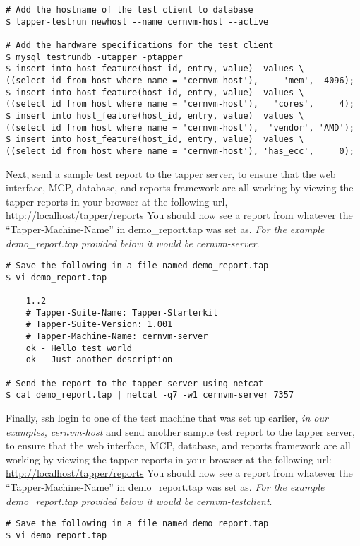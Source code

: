 \begin{enumerate}
{\lstset{caption= Adding Test Clients to Tapper Database}
\begin{lstlisting}
# Add the hostname of the test client to database
$ tapper-testrun newhost --name cernvm-host --active

# Add the hardware specifications for the test client
$ mysql testrundb -utapper -ptapper
$ insert into host_feature(host_id, entry, value)  values \
((select id from host where name = 'cernvm-host'),     'mem',  4096);
$ insert into host_feature(host_id, entry, value)  values \
((select id from host where name = 'cernvm-host'),   'cores',     4);
$ insert into host_feature(host_id, entry, value)  values \
((select id from host where name = 'cernvm-host'),  'vendor', 'AMD');
$ insert into host_feature(host_id, entry, value)  values \
((select id from host where name = 'cernvm-host'), 'has_ecc',     0);
\end{lstlisting}


\item 	Next, send a sample test report to the tapper server, to ensure that the web interface, MCP, database, and reports
		framework are all working by viewing the tapper reports in your browser at the following url, 
		\url{http://localhost/tapper/reports} You should now see a report from whatever the ``Tapper-Machine-Name'' in 
		demo\_report.tap was set as. \emph{For the example demo\_report.tap provided below it would be cernvm-server}.
\lstset{caption= Send a Report from the \tapper~Server to Itself}
\begin{lstlisting}
# Save the following in a file named demo_report.tap
$ vi demo_report.tap

	1..2
	# Tapper-Suite-Name: Tapper-Starterkit
	# Tapper-Suite-Version: 1.001
	# Tapper-Machine-Name: cernvm-server
	ok - Hello test world
	ok - Just another description

# Send the report to the tapper server using netcat
$ cat demo_report.tap | netcat -q7 -w1 cernvm-server 7357
\end{lstlisting}

\item Finally, ssh login to one of the test machine that was set up earlier, \emph{in our examples, cernvm-host} and send another 
sample test report to the tapper server, to ensure that the web interface, MCP, database, and reports framework are all working by
viewing the tapper reports in your browser at the following url: \url{http://localhost/tapper/reports} 
You should now see a report from whatever the ``Tapper-Machine-Name'' in demo\_report.tap was set as. \emph{For the example 
demo\_report.tap provided below it would be cernvm-testclient}.
\lstset{caption= Send a Report to the \tapper~Server from a Test Client}
\begin{lstlisting}
# Save the following in a file named demo_report.tap
$ vi demo_report.tap


\end{lstlisting}}
\end{enumerate}
